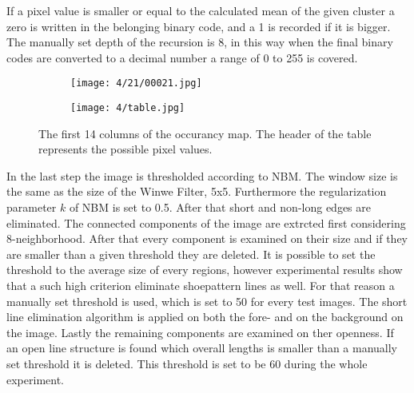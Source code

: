\documentclass[draft,final]{vutinfth} %
\begin{document}
If a pixel value is smaller or equal to the calculated mean of the given cluster a zero is written in the belonging binary code, and a 1 is recorded if it is bigger.
The manually set depth of the recursion is 8, in this way when the final binary codes are converted to a decimal number a range of 0 to 255 is covered.
\begin{figure}[h]
  \centering
  \begin{subfigure}[b]{0.09\columnwidth}
    \centering
    \texttt{[image: 4/21/00021.jpg]}
  \end{subfigure}
  \begin{subfigure}[b]{0.9\columnwidth}
    \centering
    \texttt{[image: 4/table.jpg]}
  \end{subfigure}
  \caption{The first 14 columns of the occurancy map. The header of the table represents the possible pixel values. }
  \label{fig:fans:table} %
\end{figure}
\par
In the last step the image is thresholded according to NBM.
The window size is the same as the size of the Winwe Filter, 5x5.
Furthermore the regularization parameter $k$ of NBM is set to 0.5.
After that short and non-long edges are eliminated.
The connected components of the image are extrcted first considering 8-neighborhood.
After that every component is examined on their size and if they are smaller than a given threshold they are deleted.
It is possible to set the threshold to the average size of every regions, however experimental results show that a such high criterion eliminate shoepattern lines as well.
For that reason a manually set threshold is used, which is set to 50 for every test images.
The short line elimination algorithm is applied on both the fore- and on the background on the image.
Lastly the remaining components are examined on ther openness.
If an open line structure is found which overall lengths is smaller than a manually set threshold it is deleted.
This threshold is set to be 60 during the whole experiment.
\end{document}

